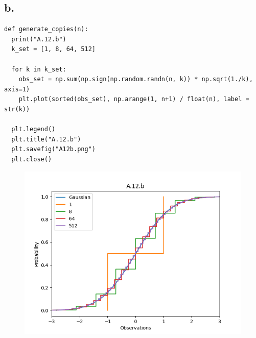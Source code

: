\documentclass{article}
\newcommand{\1}{\mathbf{1}}
\begin{document}
{\subsection*{b.}
\begin{verbatim}
def generate_copies(n):
  print("A.12.b")
  k_set = [1, 8, 64, 512]

  for k in k_set:
    obs_set = np.sum(np.sign(np.random.randn(n, k)) * np.sqrt(1./k), axis=1)
    plt.plot(sorted(obs_set), np.arange(1, n+1) / float(n), label = str(k))

  plt.legend()
  plt.title("A.12.b")
  plt.savefig("A12b.png")
  plt.close()
\end{verbatim}

\begin{figure}[ht!]
  \centering
  \includegraphics[width=130mm]{A12b.PNG}
\end{figure}

}
\end{document}
